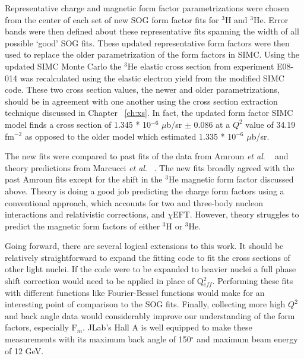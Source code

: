 Representative charge and magnetic form factor parametrizations were chosen from the center of each set of new SOG form factor fits for $^3$H and $^3$He. Error bands were then defined about these representative fits spanning the width of all possible `good' SOG fits. These updated representative form factors were then used to replace the older parametrization of the form factors in SIMC. Using the updated SIMC Monte Carlo the $^3$He elastic cross section from experiment E08-014 was recalculated using the elastic electron yield from the modified SIMC code. These two cross section values, the newer and older parametrizations, should be in agreement with one another using the cross section extraction technique discussed in Chapter ~\ref{ch:xs}. In fact, the updated form factor SIMC model finds a cross section of 1.345 * 10$^{-6}$ $\mu$b/sr $\pm$ 0.086 at a $Q^2$ value of 34.19 fm$^{-2}$ as opposed to the older model which estimated 1.335 * 10$^{-6}$ $\mu$b/sr.

The new fits were compared to past fits of the data from Amroun \textit{et al}. ~\cite{Article:Amroun} and theory predictions from Marcucci \textit{et al}. ~\cite{Article:Marcucci}. The new fits broadly agreed with the past Amroun fits except for the shift in the $^3$He magnetic form factor discussed above. Theory is doing a good job predicting the charge form factors using a conventional approach, which accounts for two and three-body nucleon interactions and relativistic corrections, and $\chi$EFT. However, theory struggles to predict the magnetic form factors of either $^3$H or $^3$He. 

Going forward, there are several logical extensions to this work. It should be relatively straightforward to expand the fitting code to fit the cross sections of other light nuclei. If the code were to be expanded to heavier nuclei a full phase shift correction would need to be applied in place of Q$^2_{eff}$. Performing these fits with different functions like Fourier-Bessel functions would make for an interesting point of comparison to the SOG fits. Finally, collecting more high $Q^2$ and back angle data would considerably improve our understanding of the form factors, especially F$_m$. JLab's Hall A is well equipped to make these measurements with its maximum back angle of 150$^{\circ}$ and maximum beam energy of 12 GeV.